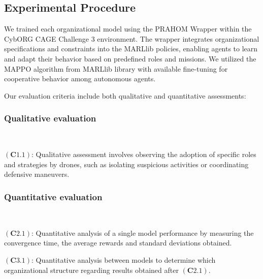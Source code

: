 \documentclass[conference]{IEEEtran}
\begin{document}
\subsection{Experimental Procedure}

We trained each organizational model using the PRAHOM Wrapper within the CybORG CAGE Challenge 3 environment. The wrapper integrates organizational specifications and constraints into the MARLlib policies, enabling agents to learn and adapt their behavior based on predefined roles and missions. We utilized the MAPPO algorithm from MARLlib library with available fine-tuning for cooperative behavior among autonomous agents.

Our evaluation criteria include both qualitative and quantitative assessments:

\subsubsection{Qualitative evaluation}

\

$(\mathbf{C1.1})$: \quad Qualitative assessment involves observing the adoption of specific roles and strategies by drones, such as isolating suspicious activities or coordinating defensive maneuvers.

\subsubsection{Quantitative evaluation}

\

$(\mathbf{C2.1})$: \quad Quantitative analysis of a single model performance by measuring the convergence time, the average rewards and standard deviations obtained.\

$(\mathbf{C3.1})$: \quad Quantitative analysis between  models to determine which organizational structure regarding results obtained after $(\mathbf{C2.1})$.
\end{document}
